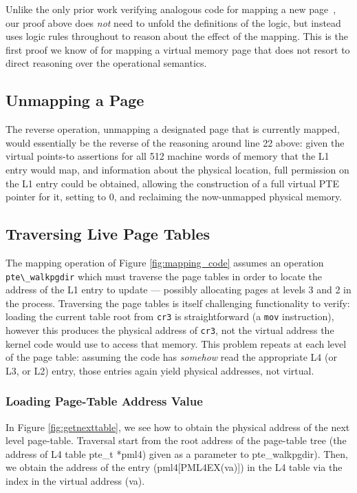 Unlike the only prior work verifying analogous code for mapping a new page~\cite{kolanski08vstte,kolanski09tphols}, our proof above
does \emph{not} need to unfold the definitions of the logic,
but instead uses logic rules throughout to reason about the effect of the mapping. 
This is the first proof we know of for mapping a virtual memory page that does not resort to direct reasoning over the operational semantics.

\subsection{Unmapping a Page}
The reverse operation, unmapping a designated page that is currently mapped,
would essentially be the reverse of
the reasoning around line 22 above: given the virtual points-to assertions for all 512
machine words of memory that the L1 entry would map,
and information about the physical location, 
full permission on the L1 entry could be obtained, allowing the construction of a
full virtual PTE pointer for it, setting to 0, and reclaiming the now-unmapped physical memory.

\subsection{Traversing Live Page Tables}
\label{sec:traversing}
The mapping operation of Figure \ref{fig:mapping_code} assumes an operation \lstinline|pte\_walkpgdir| which must traverse the page tables
in order to locate the address of the L1 entry to update --- possibly allocating pages at levels 3 and 2 in the process.
Traversing the page tables is itself challenging functionality to verify: loading the current table root from \lstinline|cr3| is straightforward
(a \lstinline|mov| instruction), however this produces the physical address of \lstinline|cr3|, not the virtual address the kernel code would use to access that memory.
This problem repeats at each level of the page table: assuming the code has \emph{somehow} read the appropriate L4 (or L3, or L2) entry, those entries again
yield physical addresses, not virtual.

\subsubsection{Loading Page-Table Address Value}
In Figure \ref{fig:getnexttable}, we see how to obtain the physical address of the next level page-table. Traversal start from the root address of the page-table tree (the address of L4 table \textsf{pte\_t *pml4}) given as a parameter to \textsf{pte\_walkpgdir}). Then, we obtain the address of the entry (\textsf{pml4[PML4EX(va)]}) in the L4 table via the index in the virtual address (\textsf{va}).

